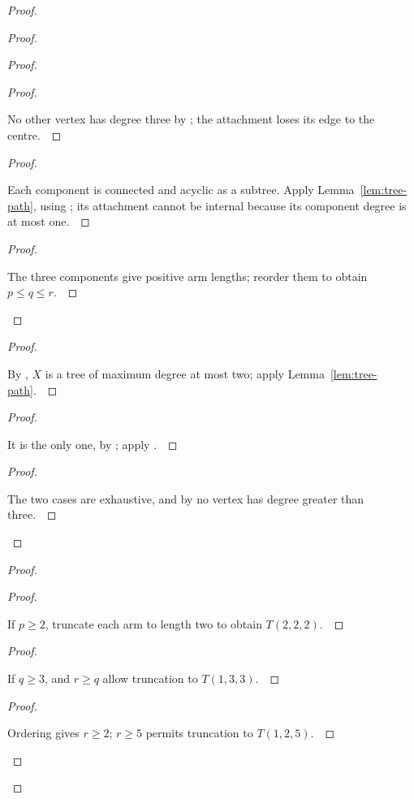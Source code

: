 \documentclass[11pt]{amsart}
\let\qed\relax
\theoremstyle{definition}
\begin{document}
\begin{proof}
\begin{proof}
\begin{proof}
\begin{proof}
\pf\ \raggedright No other vertex has degree three by ; the attachment loses its edge to the centre.~\qed
\end{proof}
\begin{proof}
\pf\ \raggedright Each component is connected and acyclic as a subtree. Apply Lemma~\ref{lem:tree-path}, using ; its attachment cannot be internal because its component degree is at most one.~\qed
\end{proof}
\qedstep
\begin{proof}
\pf\ \raggedright The three components give positive arm lengths; reorder them to obtain $p\le q\le r$.~\qed
\end{proof}
\end{proof}
\begin{proof}
\pf\ \raggedright By , $X$ is a tree of maximum degree at most two; apply Lemma~\ref{lem:tree-path}.~\qed
\end{proof}
\begin{proof}
\pf\ \raggedright It is the only one, by ; apply .~\qed
\end{proof}
\qedstep
\begin{proof}
\pf\ \raggedright The two cases are exhaustive, and by  no vertex has degree greater than three.~\qed
\end{proof}
\end{proof}
\begin{proof}
\begin{proof}
\pf\ \raggedright If $p\ge2$, truncate each arm to length two to obtain $T(2,2,2)$.~\qed
\end{proof}
\begin{proof}
\pf\ \raggedright If $q\ge3$,  and $r\ge q$ allow truncation to $T(1,3,3)$.~\qed
\end{proof}
\begin{proof}
\pf\ \raggedright Ordering gives $r\ge2$; $r\ge5$ permits truncation to $T(1,2,5)$.~\qed

\end{proof}
\end{proof}
\end{proof}
\end{document}
